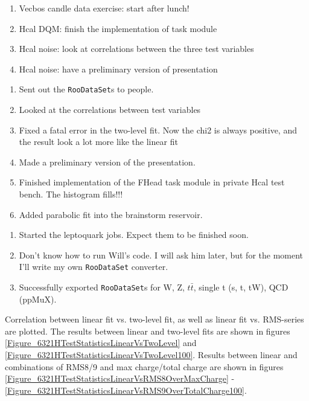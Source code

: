 

\begin{enumerate}
\item Vecbos candle data exercise: start after lunch!
\item Hcal DQM: finish the implementation of task module
\item Hcal noise: look at correlations between the three test variables
\item Hcal noise: have a preliminary version of presentation
\end{enumerate}


\begin{enumerate}
\item Sent out the \texttt{RooDataSet}s to people.
\item Looked at the correlations between test variables
\item Fixed a fatal error in the two-level fit.  Now the chi2 is always positive, and the result look a lot more like the linear fit
\item Made a preliminary version of the presentation.
\item Finished implementation of the FHead task module in private Hcal test bench.  The histogram fills!!!
\item Added parabolic fit into the brainstorm reservoir.
\end{enumerate}


\begin{enumerate}
\item Started the leptoquark jobs.  Expect them to be finished soon.
\item Don't know how to run Will's code.  I will ask him later, but for the moment I'll write my own \texttt{RooDataSet} converter.
\item Successfully exported \texttt{RooDataSet}s for W, Z, $t\bar{t}$, single t (s, t, tW), QCD (ppMuX).
\end{enumerate}


Correlation between linear fit vs. two-level fit, as well as linear fit vs. RMS-series are plotted.
The results between linear and two-level fits are shown in figures \ref{Figure_6321HTestStatisticsLinearVsTwoLevel}
and \ref{Figure_6321HTestStatisticsLinearVsTwoLevel100}.  Results between linear and combinations
of RMS8/9 and max charge/total charge are shown in figures \ref{Figure_6321HTestStatisticsLinearVsRMS8OverMaxCharge}
- \ref{Figure_6321HTestStatisticsLinearVsRMS9OverTotalCharge100}.

